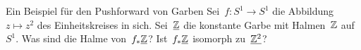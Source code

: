 \documentclass{uebblatt}
\begin{document}
\begin{aufgabe}{Ein Beispiel für den Pushforward von Garben}
Sei~$f : S^1 \to S^1$ die Abbildung~$z \mapsto z^2$ des Einheitskreises in
sich. Sei~$\underline{\mathbb{Z}}$ die konstante Garbe mit Halmen~$\mathbb{Z}$ auf~$S^1$. Was sind
die Halme von~$f_*\underline{\mathbb{Z}}$? Ist~$f_*\underline{\mathbb{Z}}$ isomorph zu~$\underline{\mathbb{Z}^2}$?
\end{aufgabe}

\end{document}
